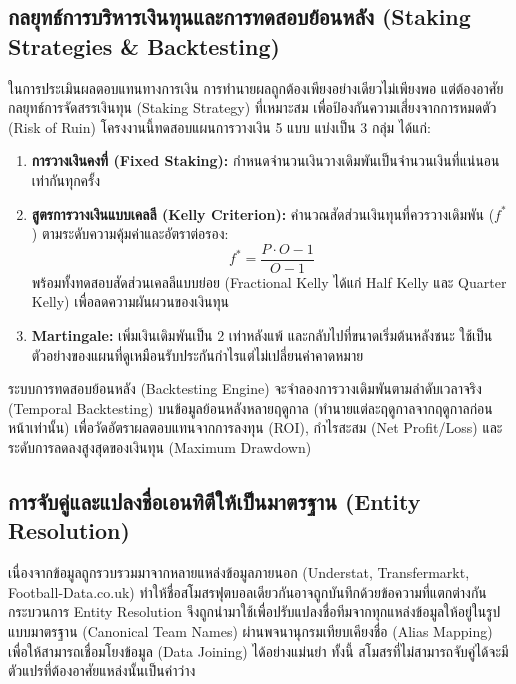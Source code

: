 \subsection{กลยุทธ์การบริหารเงินทุนและการทดสอบย้อนหลัง (Staking Strategies \& Backtesting)}

ในการประเมินผลตอบแทนทางการเงิน การทำนายผลถูกต้องเพียงอย่างเดียวไม่เพียงพอ แต่ต้องอาศัยกลยุทธ์การจัดสรรเงินทุน (Staking Strategy) ที่เหมาะสม เพื่อป้องกันความเสี่ยงจากการหมดตัว (Risk of Ruin) โครงงานนี้ทดสอบแผนการวางเงิน 5 แบบ แบ่งเป็น 3 กลุ่ม ได้แก่:
\begin{enumerate}[label=\arabic*)]
    \item \textbf{การวางเงินคงที่ (Fixed Staking):} กำหนดจำนวนเงินวางเดิมพันเป็นจำนวนเงินที่แน่นอนเท่ากันทุกครั้ง
    \item \textbf{สูตรการวางเงินแบบเคลลี (Kelly Criterion):} คำนวณสัดส่วนเงินทุนที่ควรวางเดิมพัน ($f^*$) ตามระดับความคุ้มค่าและอัตราต่อรอง:
    \begin{equation}
        f^* = \frac{P \cdot O - 1}{O - 1}
    \end{equation}
    พร้อมทั้งทดสอบสัดส่วนเคลลีแบบย่อย (Fractional Kelly ได้แก่ Half Kelly และ Quarter Kelly) เพื่อลดความผันผวนของเงินทุน
    \item \textbf{Martingale:} เพิ่มเงินเดิมพันเป็น 2 เท่าหลังแพ้ และกลับไปที่ขนาดเริ่มต้นหลังชนะ ใช้เป็นตัวอย่างของแผนที่ดูเหมือนรับประกันกำไรแต่ไม่เปลี่ยนค่าคาดหมาย
\end{enumerate}
ระบบการทดสอบย้อนหลัง (Backtesting Engine) จะจำลองการวางเดิมพันตามลำดับเวลาจริง (Temporal Backtesting) บนข้อมูลย้อนหลังหลายฤดูกาล (ทำนายแต่ละฤดูกาลจากฤดูกาลก่อนหน้าเท่านั้น) เพื่อวัดอัตราผลตอบแทนจากการลงทุน (ROI), กำไรสะสม (Net Profit/Loss) และระดับการลดลงสูงสุดของเงินทุน (Maximum Drawdown)

\subsection{การจับคู่และแปลงชื่อเอนทิตีให้เป็นมาตรฐาน (Entity Resolution)}

เนื่องจากข้อมูลถูกรวบรวมมาจากหลายแหล่งข้อมูลภายนอก (Understat, Transfermarkt, Football-Data.co.uk) ทำให้ชื่อสโมสรฟุตบอลเดียวกันอาจถูกบันทึกด้วยข้อความที่แตกต่างกัน กระบวนการ Entity Resolution จึงถูกนำมาใช้เพื่อปรับแปลงชื่อทีมจากทุกแหล่งข้อมูลให้อยู่ในรูปแบบมาตรฐาน (Canonical Team Names) ผ่านพจนานุกรมเทียบเคียงชื่อ (Alias Mapping) เพื่อให้สามารถเชื่อมโยงข้อมูล (Data Joining) ได้อย่างแม่นยำ ทั้งนี้ สโมสรที่ไม่สามารถจับคู่ได้จะมีตัวแปรที่ต้องอาศัยแหล่งนั้นเป็นค่าว่าง

